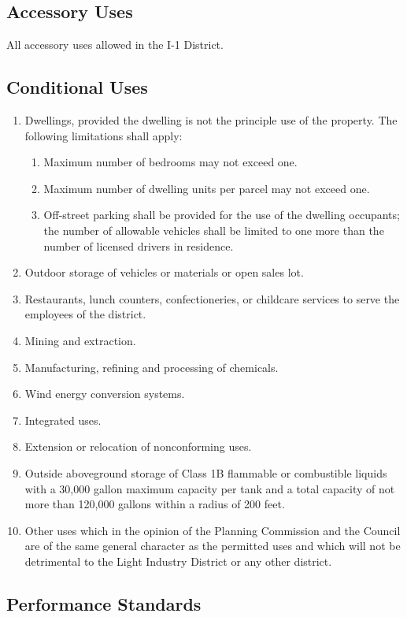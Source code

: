 \subsection{Accessory Uses}
All accessory uses allowed in the I-1 District.
\subsection{Conditional Uses}
\begin{enumerate}[{\indent}1)]
    \item Dwellings, provided the dwelling is not the principle use of the property. The following limitations shall apply:
        \begin{enumerate}
            \item Maximum number of bedrooms may not exceed one.
            \item Maximum number of dwelling units per parcel may not exceed one.
            \item Off-street parking shall be provided for the use of the dwelling occupants; the number of allowable vehicles shall be limited to one more than the number of licensed drivers in residence.
        \end{enumerate}
    \item Outdoor storage of vehicles or materials or open sales lot.
    \item Restaurants, lunch counters, confectioneries, or childcare services to serve the employees of the district.
    \item Mining and extraction.
    \item Manufacturing, refining and processing of chemicals.
    \item Wind energy conversion systems.
    \item Integrated uses.
    \item Extension or relocation of nonconforming uses.
    \item  Outside aboveground storage of Class 1B flammable or combustible liquids with a 30,000 gallon maximum capacity per tank and a total capacity of not more than 120,000 gallons within a radius of 200 feet.
    \item Other uses which in the opinion of the Planning Commission and the Council are of the same general character as the permitted uses and which will not be detrimental to the Light Industry District or any other district.
\end{enumerate}
\subsection{Performance Standards}
